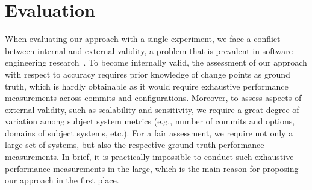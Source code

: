 \documentclass[sigconf]{acmart}
\begin{document}

	
	\section{Evaluation}
	When evaluating our approach with a single experiment, we face a conflict between internal and external validity, a problem that is prevalent in software engineering research~\cite{siegmund_views_2015}. 
	To become internally valid, the assessment of our approach with respect to accuracy requires prior knowledge of change points as ground truth, which is hardly obtainable as it would require exhaustive performance measurements across commits and configurations. Moreover, to assess aspects of external validity, such as scalability and sensitivity, we require a great degree of variation among subject system metrics (e.g., number of commits and options, domains of subject systems, etc.). 
	For a fair assessment, we require not only a large set of systems, but also the respective ground truth performance measurements. In brief, it is practically impossible to conduct such exhaustive performance measurements in the large, which is the main reason for proposing our approach in the first place.
\end{document}
